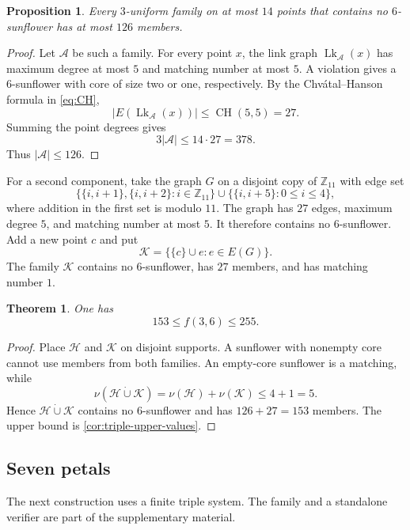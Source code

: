 \documentclass[11pt]{article}
\numberwithin{equation}{section}
\newtheorem{theorem}{Theorem}[section]
\newtheorem{proposition}[proposition]{Proposition}
\theoremstyle{definition}
\theoremstyle{remark}
\newcommand{\A}{\mathcal A}
\newcommand{\Hh}{\mathcal H}
\newcommand{\K}{\mathcal K}
\newcommand{\CH}{\operatorname{CH}}
\newcommand{\Lk}{\operatorname{Lk}}
\newcommand{\Z}{\mathbb Z}
\newcommand{\dd}{\mathbin{\dot\cup}}
\begin{document}
\begin{proposition}
\label{prop:f36-fourteen-points}
Every $3$-uniform family on at most $14$ points that contains no
$6$-sunflower has at most $126$ members.
\end{proposition}

\begin{proof}
Let $\A$ be such a family. For every point $x$, the link graph
$\Lk_{\A}(x)$ has maximum degree at most $5$ and matching number at most
$5$. A violation gives a $6$-sunflower with core of size two or one,
respectively. By the Chv\'atal--Hanson formula in \eqref{eq:CH},
\[
 |E(\Lk_{\A}(x))|\le\CH(5,5)=27.
\]
Summing the point degrees gives
\[
 3|\A|\le14\cdot27=378.
\]
Thus $|\A|\le126$.
\end{proof}

For a second component, take the graph $G$ on a disjoint copy of $\Z_{11}$
with edge set
\begin{equation}
 \bigl\{\{i,i+1\},\{i,i+2\}:i\in\Z_{11}\bigr\}
 \mathbin{\cup}
 \bigl\{\{i,i+5\}:0\le i\le4\bigr\},
 \label{eq:f36-graph}
\end{equation}
where addition in the first set is modulo $11$. The graph has $27$ edges,
maximum degree $5$, and matching number at most $5$. It therefore contains
no $6$-sunflower. Add a new point $c$ and put
\[
 \K=\bigl\{\{c\}\cup e:e\in E(G)\bigr\}.
\]
The family $\K$ contains no $6$-sunflower, has $27$ members, and has matching
number $1$.

\begin{theorem}
\label{thm:f36-bounds}
One has
\[
 153\le f(3,6)\le255.
\]
\end{theorem}

\begin{proof}
Place $\Hh$ and $\K$ on disjoint supports. A sunflower with nonempty core
cannot use members from both families. An empty-core sunflower is a
matching, while
\[
 \nu(\Hh\dd\K)=\nu(\Hh)+\nu(\K)\le4+1=5.
\]
Hence $\Hh\dd\K$ contains no $6$-sunflower and has $126+27=153$ members.
The upper bound is \cref{cor:triple-upper-values}.
\end{proof}

\subsection{Seven petals}

The next construction uses a finite triple system. The family and a
standalone verifier are part of the supplementary material.
\end{document}
